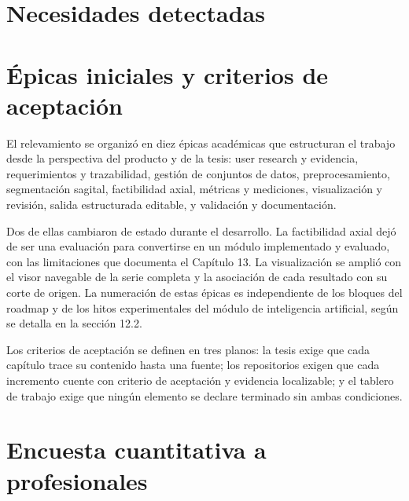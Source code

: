 
\section{Necesidades detectadas}


\section{Épicas iniciales y criterios de aceptación}

El relevamiento se organizó en diez épicas académicas que estructuran el trabajo desde la perspectiva del producto y de la tesis: user research y evidencia, requerimientos y trazabilidad, gestión de conjuntos de datos, preprocesamiento, segmentación sagital, factibilidad axial, métricas y mediciones, visualización y revisión, salida estructurada editable, y validación y documentación.

Dos de ellas cambiaron de estado durante el desarrollo. La factibilidad axial dejó de ser una evaluación para convertirse en un módulo implementado y evaluado, con las limitaciones que documenta el Capítulo 13. La visualización se amplió con el visor navegable de la serie completa y la asociación de cada resultado con su corte de origen. La numeración de estas épicas es independiente de los bloques del roadmap y de los hitos experimentales del módulo de inteligencia artificial, según se detalla en la sección 12.2.

Los criterios de aceptación se definen en tres planos: la tesis exige que cada capítulo trace su contenido hasta una fuente; los repositorios exigen que cada incremento cuente con criterio de aceptación y evidencia localizable; y el tablero de trabajo exige que ningún elemento se declare terminado sin ambas condiciones.

\section{Encuesta cuantitativa a profesionales}

